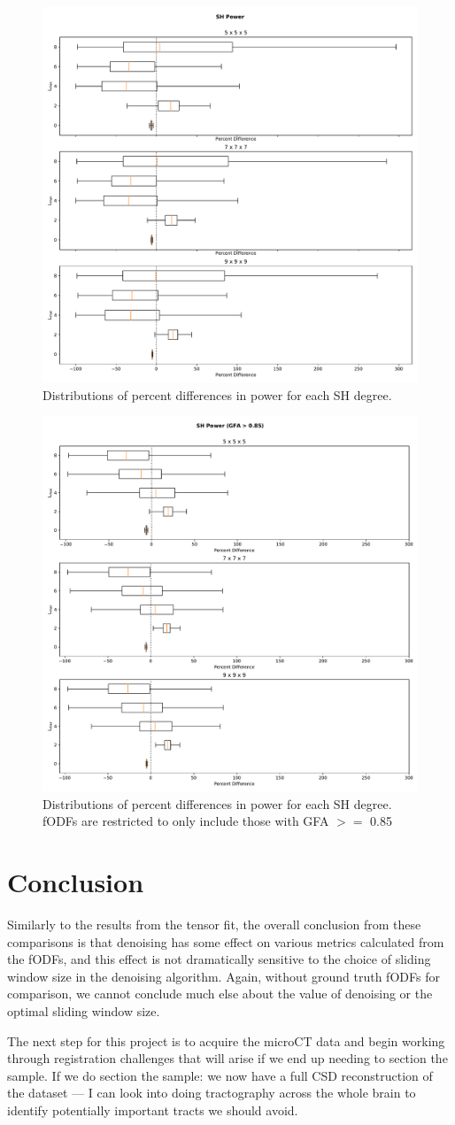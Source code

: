 \documentclass{article}
\begin{document}
\begin{figure}[H]
  \centering
  \includegraphics[width=0.5\linewidth]{../figs/shpower_gfa0}
  \captionsetup{width=0.6\linewidth}
  \caption{Distributions of percent differences in power for each SH degree.}
  \label{fig:shpower0}
\end{figure}

\begin{figure}[H]
  \centering
  \includegraphics[width=0.5\linewidth]{../figs/shpower_gfa85}
  \captionsetup{width=0.6\linewidth}
  \caption{Distributions of percent differences in power for each SH
    degree. fODFs are restricted to only include those with GFA $>=$ 0.85}
  \label{fig:shpower85}
\end{figure}

\section{Conclusion}
Similarly to the results from the tensor fit, the overall conclusion from these
comparisons is that denoising has some effect on various metrics calculated from
the fODFs, and this effect is not dramatically sensitive to the choice of
sliding window size in the denoising algorithm. Again, without ground truth
fODFs for comparison, we cannot conclude much else about the value of denoising
or the optimal sliding window size.

The next step for this project is to acquire the microCT data and begin working
through registration challenges that will arise if we end up needing to section
the sample. If we do section the sample: we now have a full CSD reconstruction
of the dataset --- I can look into doing tractography across the whole brain to
identify potentially important tracts we should avoid.



\end{document}

